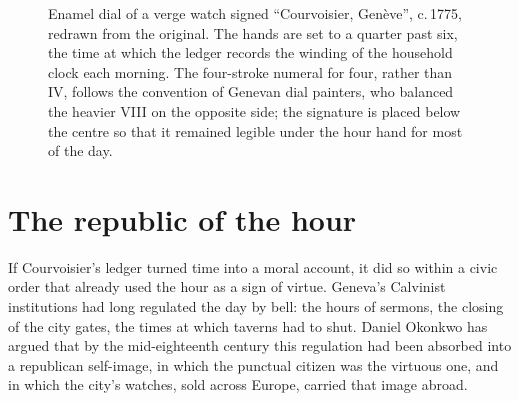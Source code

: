 \documentclass[11pt]{article}
\begin{document}
\begin{figure}[t]
\centering
{}
\caption{Enamel dial of a verge watch signed \enquote{Courvoisier, Genève},
c.\,1775, redrawn from the original. The hands are set to a quarter past
six, the time at which the ledger records the winding of the household
clock each morning. The four-stroke numeral for four, rather than IV, follows
the convention of Genevan dial painters, who balanced the heavier VIII on
the opposite side; the signature is placed below the centre so that it
remained legible under the hour hand for most of the day.}
\label{fig:dial}
\end{figure}

\section{The republic of the hour}

If Courvoisier's ledger turned time into a moral account, it did so within a
civic order that already used the hour as a sign of virtue. Geneva's
Calvinist institutions had long regulated the day by bell: the hours of
sermons, the closing of the city gates, the times at which taverns had to
shut.\autocite[201--219]{dohrn1996} Daniel Okonkwo has argued that by the
mid-eighteenth century this regulation had been absorbed into a republican
self-image, in which the punctual citizen was the virtuous one, and in which
the city's watches, sold across Europe, carried that image
abroad.\autocite[150--156]{okonkwo2019}
\end{document}
